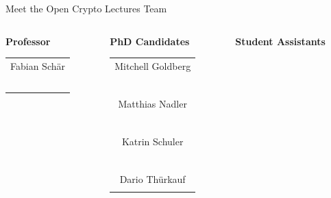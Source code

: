 \documentclass[handout]{beamer}
\begin{document}
\begin{frame}{Meet the Open Crypto Lectures Team}
	\begin{columns}[T]
		\begin{column}{0.31\textwidth}
			\center \textbf{Professor}
			\begin{table}\small
				\begin{tabular}{c}
					Fabian Schär\\
					\href{https://linkedin.com/in/fabian-schaer/}{\faLinkedinSquare}\ \href{https://twitter.com/fschaer}{\faTwitterSquare}\\
				\end{tabular}
			\end{table}
		\end{column}
		\begin{column}{0.31\textwidth}
			\center \textbf{PhD Candidates}
			\begin{table}\small
				\begin{tabular}{c}
					Mitchell Goldberg\\
					\href{https://linkedin.com/in/mitchell-goldberg/}{\faLinkedinSquare}\ \href{https://twitter.com/golmit_crypto}{\faTwitterSquare}\\
					\vspace{0.5em}\\
					Matthias Nadler\\
					\href{https://linkedin.com/in/mat-nadler/}{\faLinkedinSquare}\ \href{https://twitter.com/mat_nadler}{\faTwitterSquare}\\
					\vspace{0.5em}\\
					Katrin Schuler\\
					\href{https://linkedin.com/in/kmschuler/}{\faLinkedinSquare}\ \href{https://twitter.com/scalibality}{\faTwitterSquare}\\
					\vspace{0.5em}\\
					Dario Thürkauf\\
					\href{https://linkedin.com/in/dario-thuerkauf/}{\faLinkedinSquare} \href{https://twitter.com/dario_thuerkauf}{\faTwitterSquare}\\
				\end{tabular}
			\end{table}
		\end{column}
		\begin{column}{0.31\textwidth}
			\center \textbf{Student Assistants}
			\begin{table}\small
				\begin{tabular}{c}

\end{tabular}
\end{table}
\end{column}
\end{columns}
\end{frame}
\end{document}
